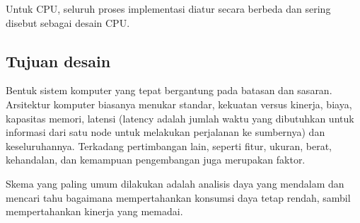 {Untuk CPU, seluruh proses implementasi diatur secara berbeda dan sering disebut sebagai desain CPU.

\subsection{Tujuan desain}
Bentuk sistem komputer yang tepat bergantung pada batasan dan sasaran. Arsitektur komputer biasanya menukar standar, kekuatan versus kinerja, biaya, kapasitas memori, latensi (latency adalah jumlah waktu yang dibutuhkan untuk informasi dari satu node untuk melakukan perjalanan ke sumbernya) dan keseluruhannya. Terkadang pertimbangan lain, seperti fitur, ukuran, berat, kehandalan, dan kemampuan pengembangan juga merupakan faktor.

Skema yang paling umum dilakukan adalah analisis daya yang mendalam dan mencari tahu bagaimana mempertahankan konsumsi daya tetap rendah, sambil mempertahankan kinerja yang memadai.
}
